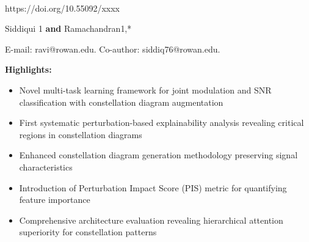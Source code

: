 \documentclass{ELSP}
\begin{document}
\thispagestyle{firstpage}

\let\thefootnote\relax
{}

\begin{flushleft}
{\sffamily \small {}}\\
{\sffamily\small{https://doi.org/10.55092/xxxx}}


 {Siddiqui} {1}
\textbf{and} 
 {Ramachandran}{1,}{*}


 {E-mail: ravi@rowan.edu. Co-author: siddiq76@rowan.edu.}
\end{flushleft}

\noindent\textbf{\textcolor[RGB]{0,131,255}{Highlights:}}\\
\newline
\begin{itemize}
    \item Novel multi-task learning framework for joint modulation and SNR classification with constellation diagram augmentation
    \item First systematic perturbation-based explainability analysis revealing critical regions in constellation diagrams
    \item Enhanced constellation diagram generation methodology preserving signal characteristics
    \item Introduction of Perturbation Impact Score (PIS) metric for quantifying feature importance
    \item Comprehensive architecture evaluation revealing hierarchical attention superiority for constellation patterns
\end{itemize}
\end{document}
